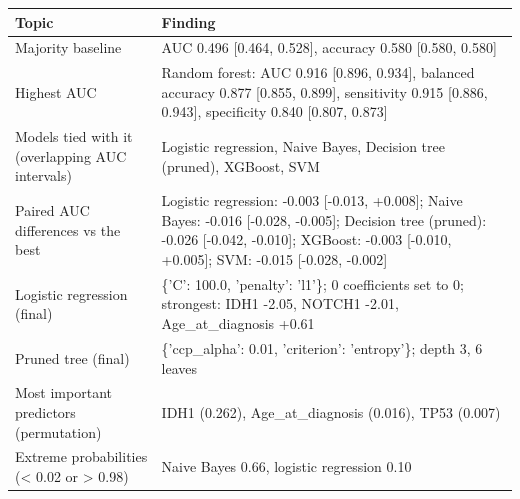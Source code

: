 \begin{tabular}{p{4.5cm}p{10.5cm}}
\toprule
\textbf{Topic} & \textbf{Finding} \\
\midrule
Majority baseline & AUC 0.496 [0.464, 0.528], accuracy 0.580 [0.580, 0.580] \\
Highest AUC & Random forest: AUC 0.916 [0.896, 0.934], balanced accuracy 0.877 [0.855, 0.899], sensitivity 0.915 [0.886, 0.943], specificity 0.840 [0.807, 0.873] \\
Models tied with it (overlapping AUC intervals) & Logistic regression, Naive Bayes, Decision tree (pruned), XGBoost, SVM \\
Paired AUC differences vs the best & Logistic regression: -0.003 [-0.013, +0.008]; Naive Bayes: -0.016 [-0.028, -0.005]; Decision tree (pruned): -0.026 [-0.042, -0.010]; XGBoost: -0.003 [-0.010, +0.005]; SVM: -0.015 [-0.028, -0.002] \\
Logistic regression (final) & \{'C': 100.0, 'penalty': 'l1'\}; 0 coefficients set to 0; strongest: IDH1 -2.05, NOTCH1 -2.01, Age\_at\_diagnosis +0.61 \\
Pruned tree (final) & \{'ccp\_alpha': 0.01, 'criterion': 'entropy'\}; depth 3, 6 leaves \\
Most important predictors (permutation) & IDH1 (0.262), Age\_at\_diagnosis (0.016), TP53 (0.007) \\
Extreme probabilities (< 0.02 or > 0.98) & Naive Bayes 0.66, logistic regression 0.10 \\
\bottomrule
\end{tabular}
